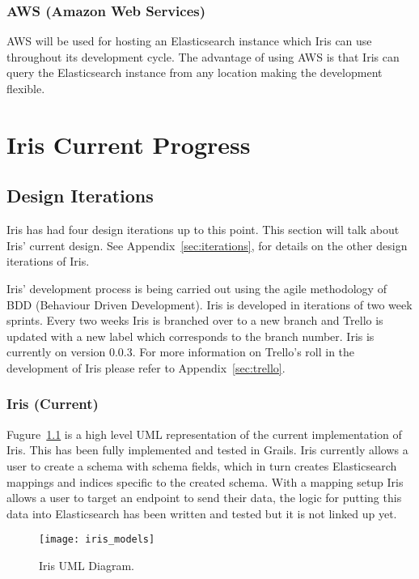 \documentclass[12pt,a4paper,titlepage]{report}
\begin{document}
\subsection{AWS (Amazon Web Services)}

AWS will be used for hosting an Elasticsearch instance which Iris can use throughout its development cycle. The advantage of using AWS is that Iris can query the Elasticsearch instance from any location making the development flexible.

\chapter{Iris Current Progress}

\section{Design Iterations}

Iris has had four design iterations up to this point. This section will talk about Iris' current design. See Appendix~\ref{sec:iterations}, for details on the other design iterations of Iris. 

Iris' development process is being carried out using the agile methodology of BDD (Behaviour Driven Development). Iris is developed in iterations of two week sprints. Every two weeks Iris is branched over to a new branch and Trello is updated with a new label which corresponds to the branch number. Iris is currently on version 0.0.3. For more information on Trello's roll in the development of Iris please refer to Appendix~\ref{sec:trello}.

\subsection{Iris (Current)}

Fugure~\ref{fig:iris_uml} is a high level UML representation of the current implementation of Iris. 
This has been fully implemented and tested in Grails. Iris currently allows a user to create a schema with schema fields, which in turn creates Elasticsearch mappings and indices specific to the created schema. With a mapping setup Iris allows a user to target an endpoint to send their data, the logic for putting this data into Elasticsearch has been written and tested but it is not linked up yet.

\begin{figure}[ht]
\begin{tcolorbox}
\texttt{[image: iris\_models]}
\end{tcolorbox}
\caption{Iris UML Diagram.}\label{fig:iris_uml}
\end{figure}
\end{document}
